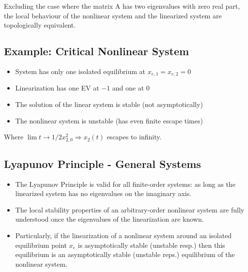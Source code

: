 \documentclass[10pt,a4paper]{scrartcl}
\begin{document}
\begin{multicols*}{3}
Excluding the case where the matrix A has two eigenvalues with zero real part, the local behaviour of the nonlinear system and the linearized system are topologically equivalent.



\subsection{Example: Critical Nonlinear System}


\begin{itemize}
\ncompaq
\item System has only one isolated equilibrium at $x_{e,1}=x_{e,2}=0$
\item Linearization has one EV at $-1$ and one at $0$
\item The solution of the linear system is stable (not asymptotically)
\item The nonlinear system is unstable (has even finite escape times)
\end{itemize}


Where $\lim t\rightarrow 1/2x_{2,0}^2\Rightarrow x_2(t)$ \dahe escapes to infinity.

\subsection{Lyapunov Principle - General Systems}

\begin{itemize}
\ncompaq
\item The Lyapunov Principle is valid for all finite-order systems: as long as the linearized system has no eigenvalues on the imaginary axis.
\item The local stability properties of an arbitrary-order nonlinear system are fully understood once the eigenvalues of the linearization are known.
\item Particularly, if the linearization of a nonlinear system around an isolated equilibrium point $x_e$ is asymptotically stable (unstable resp.) then this equilibrium is an asymptotically stable (unstable reps.) equilibrium of the nonlinear system.
\end{itemize}


\end{multicols*}
\end{document}
